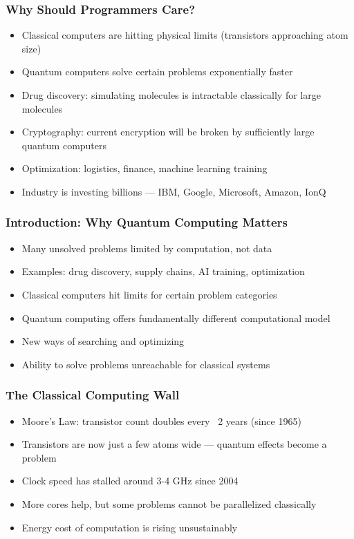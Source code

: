 \begin{frame}[fragile]\frametitle{Why Should Programmers Care?}
\begin{itemize}
\item Classical computers are hitting physical limits (transistors approaching atom size)
\item Quantum computers solve certain problems exponentially faster
\item Drug discovery: simulating molecules is intractable classically for large molecules
\item Cryptography: current encryption will be broken by sufficiently large quantum computers
\item Optimization: logistics, finance, machine learning training
\item Industry is investing billions --- IBM, Google, Microsoft, Amazon, IonQ
\end{itemize}
\end{frame}

\begin{frame}[fragile]\frametitle{Introduction: Why Quantum Computing Matters}
\begin{itemize}
\item Many unsolved problems limited by computation, not data
\item Examples: drug discovery, supply chains, AI training, optimization
\item Classical computers hit limits for certain problem categories
\item Quantum computing offers fundamentally different computational model
\item New ways of searching and optimizing
\item Ability to solve problems unreachable for classical systems
\end{itemize}
\end{frame}

\begin{frame}[fragile]\frametitle{The Classical Computing Wall}
\begin{itemize}
\item Moore's Law: transistor count doubles every ~2 years (since 1965)
\item Transistors are now just a few atoms wide --- quantum effects become a problem
\item Clock speed has stalled around 3-4 GHz since 2004
\item More cores help, but some problems cannot be parallelized classically
\item Energy cost of computation is rising unsustainably
\end{itemize}
\end{frame}

